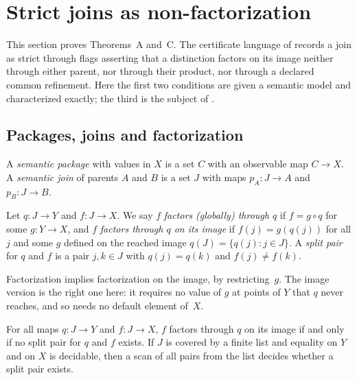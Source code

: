 \section{Strict joins as non-factorization}
\label{sec:strict-join}

This section proves Theorems~A and~C. The certificate language of
 records a join as strict through flags asserting that a distinction
factors on its image neither through either parent, nor through their product, nor
through a declared common refinement. Here the first two conditions are given a semantic model and
characterized exactly; the third is the subject of .

\subsection{Packages, joins and factorization}

\begin{definition}
\label{def:semantic-join}
A \emph{semantic package} with values in $X$ is a set $C$ with an observable map
$C\to X$. A \emph{semantic join} of parents $A$ and $B$ is a set $J$ with maps
$p_A:J\to A$ and $p_B:J\to B$.
\end{definition}

\begin{definition}
\label{def:factorization}
Let $q:J\to Y$ and $f:J\to X$. We say $f$ \emph{factors (globally) through $q$} if $f=g\circ q$ for
some $g:Y\to X$, and $f$ \emph{factors through $q$ on its image} if $f(j)=g(q(j))$ for all
$j$ and some $g$ defined on the reached image $q(J)=\{q(j):j\in J\}$. A \emph{split pair}
for $q$ and $f$ is a pair $j,k\in J$ with $q(j)=q(k)$ and $f(j)\neq f(k)$.
\end{definition}

Factorization implies factorization on the image, by restricting~$g$. The image version is
the right one here: it requires no value of $g$ at points of $Y$ that $q$ never reaches,
and so needs no default element of~$X$.

\begin{theorem}
\label{thm:split-criterion}
For all maps $q:J\to Y$ and $f:J\to X$, $f$ factors through $q$ on its image if and only if
no split pair for $q$ and $f$ exists. If $J$ is covered by a finite list and equality on
$Y$ and on $X$ is decidable, then a scan of all pairs from the list decides whether a split
pair exists.
\end{theorem}

